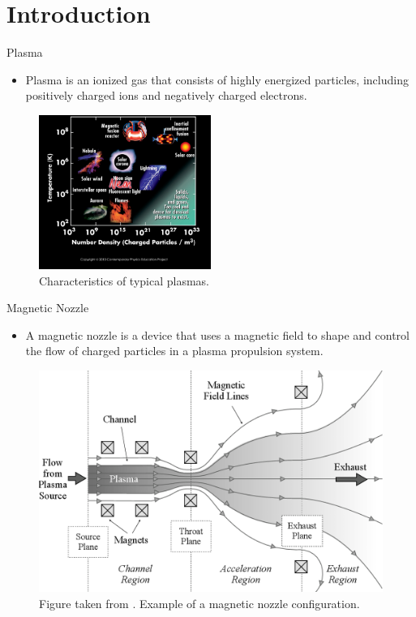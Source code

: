 \section{Introduction}
\begin{frame}{Plasma}
  \begin{itemize}
    \item Plasma is an ionized gas that consists of highly energized particles, including positively charged ions and negatively charged electrons.
  \end{itemize}

  \begin{figure}[htbp]
    \centering
    \includegraphics[width=0.5\textwidth]{../../thesis/img/introduction/plasma-properties}
    \caption{Characteristics of typical plasmas.}
    \label{fig:plasma-properties}
  \end{figure}
\end{frame}

\begin{frame}{Magnetic Nozzle}
  \begin{itemize}
    \item A magnetic nozzle is a device that uses a magnetic field to shape and control the flow of charged particles in a plasma propulsion system.
  \end{itemize}
\begin{figure}[htbp]
	\centering
	\includegraphics[width=0.7\linewidth]{../../thesis/img/introduction/magnetic-nozzle}
  \caption{Figure taken from \cite{little_performance_2015}. Example of a magnetic nozzle configuration.} 
	\label{fig:magnetic-nozzle}
\end{figure}
\end{frame}

